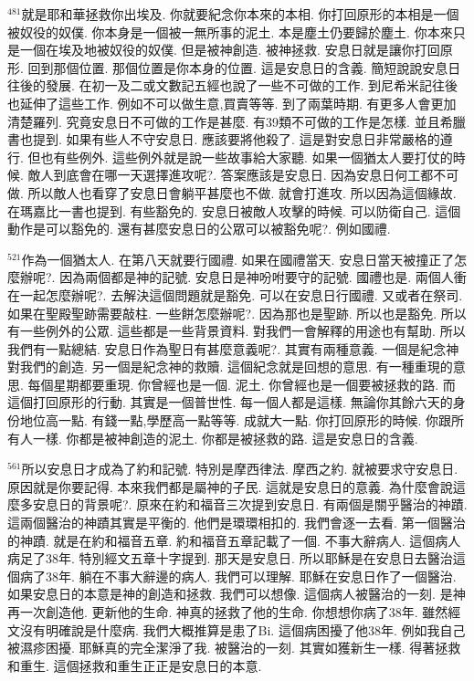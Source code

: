 \documentclass{book}
\begin{document}
$^{481}$就是耶和華拯救你出埃及.
你就要紀念你本來的本相.
你打回原形的本相是一個被奴役的奴僕.
你本身是一個被一無所事的泥土.
本是塵土仍要歸於塵土.
你本來只是一個在埃及地被奴役的奴僕.
但是被神創造.
被神拯救.
安息日就是讓你打回原形.
回到那個位置.
那個位置是你本身的位置.
這是安息日的含義.
簡短說說安息日往後的發展.
在初一及二或文數記五經也說了一些不可做的工作.
到尼希米記往後也延伸了這些工作.
例如不可以做生意,買賣等等.
到了兩葉時期.
有更多人會更加清楚羅列.
究竟安息日不可做的工作是甚麼.
有39類不可做的工作是怎樣.
並且希臘書也提到.
如果有些人不守安息日.
應該要將他殺了.
這是對安息日非常嚴格的遵行.
但也有些例外.
這些例外就是說一些故事給大家聽.
如果一個猶太人要打仗的時候.
敵人到底會在哪一天選擇進攻呢?.
答案應該是安息日.
因為安息日何工都不可做.
所以敵人也看穿了安息日會躺平甚麼也不做.
就會打進攻.
所以因為這個緣故.
在瑪嘉比一書也提到.
有些豁免的.
安息日被敵人攻擊的時候.
可以防衛自己.
這個動作是可以豁免的.
還有甚麼安息日的公眾可以被豁免呢?.
例如國禮.

$^{521}$作為一個猶太人.
在第八天就要行國禮.
如果在國禮當天.
安息日當天被撞正了怎麼辦呢?.
因為兩個都是神的記號.
安息日是神吩咐要守的記號.
國禮也是.
兩個人衝在一起怎麼辦呢?.
去解決這個問題就是豁免.
可以在安息日行國禮.
又或者在祭司.
如果在聖殿聖跡需要敲柱.
一些餅怎麼辦呢?.
因為那也是聖跡.
所以也是豁免.
所以有一些例外的公眾.
這些都是一些背景資料.
對我們一會解釋的用途也有幫助.
所以我們有一點總結.
安息日作為聖日有甚麼意義呢?.
其實有兩種意義.
一個是紀念神對我們的創造.
另一個是紀念神的救贖.
這個紀念就是回想的意思.
有一種重現的意思.
每個星期都要重現.
你曾經也是一個.
泥土.
你曾經也是一個要被拯救的路.
而這個打回原形的行動.
其實是一個普世性.
每一個人都是這樣.
無論你其餘六天的身份地位高一點.
有錢一點,學歷高一點等等.
成就大一點.
你打回原形的時候.
你跟所有人一樣.
你都是被神創造的泥土.
你都是被拯救的路.
這是安息日的含義.

$^{561}$所以安息日才成為了約和記號.
特別是摩西律法.
摩西之約.
就被要求守安息日.
原因就是你要記得.
本來我們都是屬神的子民.
這就是安息日的意義.
為什麼會說這麼多安息日的背景呢?.
原來在約和福音三次提到安息日.
有兩個是關乎醫治的神蹟.
這兩個醫治的神蹟其實是平衡的.
他們是環環相扣的.
我們會逐一去看.
第一個醫治的神蹟.
就是在約和福音五章.
約和福音五章記載了一個.
不事大辭病人.
這個病人病足了38年.
特別經文五章十字提到.
那天是安息日.
所以耶穌是在安息日去醫治這個病了38年.
躺在不事大辭邊的病人.
我們可以理解.
耶穌在安息日作了一個醫治.
如果安息日的本意是神的創造和拯救.
我們可以想像.
這個病人被醫治的一刻.
是神再一次創造他.
更新他的生命.
神真的拯救了他的生命.
你想想你病了38年.
雖然經文沒有明確說是什麼病.
我們大概推算是患了Bi.
這個病困擾了他38年.
例如我自己被濕疹困擾.
耶穌真的完全潔淨了我.
被醫治的一刻.
其實如獲新生一樣.
得著拯救和重生.
這個拯救和重生正正是安息日的本意.
\end{document}
